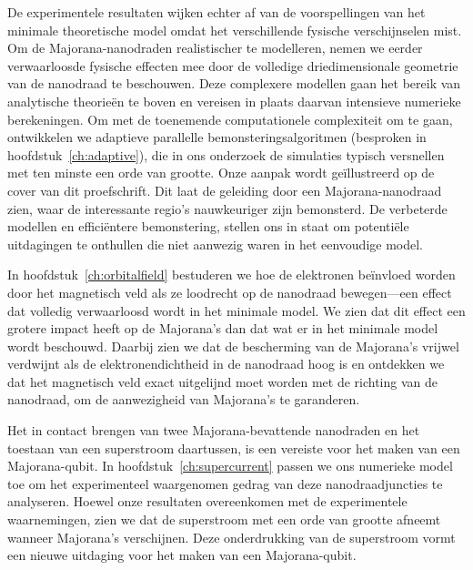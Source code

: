 {
De experimentele resultaten wijken echter af van de voorspellingen van het minimale theoretische model omdat het verschillende fysische verschijnselen mist.
Om de Majorana-nanodraden realistischer te modelleren, nemen we eerder verwaarloosde fysische effecten mee door de volledige driedimensionale geometrie van de nanodraad te beschouwen.
Deze complexere modellen gaan het bereik van analytische theorieën te boven en vereisen in plaats daarvan intensieve numerieke berekeningen.
Om met de toenemende computationele complexiteit om te gaan, ontwikkelen we adaptieve parallelle bemonsteringsalgoritmen (besproken in hoofdstuk~\ref{ch:adaptive}), die in ons onderzoek de simulaties typisch versnellen met ten minste een orde van grootte.
Onze aanpak wordt geïllustreerd op de cover van dit proefschrift.
Dit laat de geleiding door een Majorana-nanodraad zien, waar de interessante regio's nauwkeuriger zijn bemonsterd.
De verbeterde modellen en efficiëntere bemonstering, stellen ons in staat om potentiële uitdagingen te onthullen die niet aanwezig waren in het eenvoudige model.

In hoofdstuk~\ref{ch:orbitalfield} bestuderen we hoe de elektronen beïnvloed worden door het magnetisch veld als ze loodrecht op de nanodraad bewegen---een effect dat volledig verwaarloosd wordt in het minimale model.
We zien dat dit effect een grotere impact heeft op de Majorana's dan dat wat er in het minimale model wordt beschouwd.
Daarbij zien we dat de bescherming van de Majorana's vrijwel verdwijnt als de elektronendichtheid in de nanodraad hoog is en ontdekken we dat het magnetisch veld exact uitgelijnd moet worden met de richting van de nanodraad, om de aanwezigheid van Majorana's te garanderen.

Het in contact brengen van twee Majorana-bevattende nanodraden en het toestaan van een superstroom daartussen, is een vereiste voor het maken van een Majorana-qubit.
In hoofdstuk~\ref{ch:supercurrent} passen we ons numerieke model toe om het experimenteel waargenomen gedrag van deze nanodraadjuncties te analyseren.
Hoewel onze resultaten overeenkomen met de experimentele waarnemingen, zien we dat de superstroom met een orde van grootte afneemt wanneer Majorana's verschijnen.
Deze onderdrukking van de superstroom vormt een nieuwe uitdaging voor het maken van een Majorana-qubit.

}
